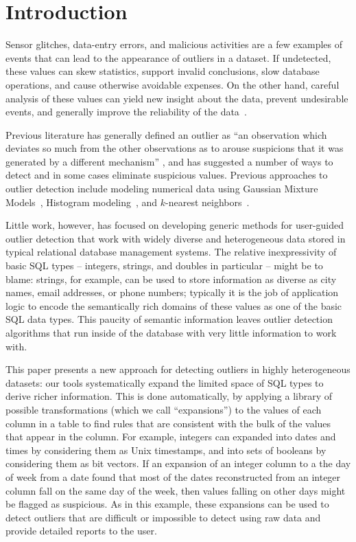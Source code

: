 \section{Introduction}
\label{sec:intro}

Sensor glitches, data-entry errors, and malicious activities are a few examples of events that can lead to the appearance of outliers in a dataset. If undetected, these values can skew statistics, support invalid conclusions, slow database operations, and cause otherwise avoidable expenses. On the other hand, careful analysis of these values can yield new insight about the data, prevent undesirable events, and generally improve the reliability of the data~\cite{Achour2014}.

Previous literature has generally defined an outlier as ``an observation which deviates so much from the other observations as to arouse suspicions that it was generated by a different mechanism'' \cite{Hawkins1980}, and has suggested a number of ways to detect and in some cases eliminate suspicious values. Previous approaches to outlier detection include modeling numerical data using Gaussian Mixture Models~\cite{Lu2005,Roberts1994,Roberts1999}, Histogram modeling~\cite{Gebski2007,Sheng2007}, and $k$-nearest neighbors~\cite{Ramaswamy2000}.

Little work, however, has focused on developing generic methods for user-guided outlier detection that work with widely diverse and heterogeneous data stored in typical relational database management systems. The relative inexpressivity of basic SQL types -- integers, strings, and doubles in particular -- might be to blame: strings, for example, can be used to store information as diverse as city names, email addresses, or phone numbers; typically it is the job of application logic to encode the semantically rich domains of these values as one of the basic SQL data types. This paucity of semantic information leaves outlier detection algorithms that run inside of the database with very little information to work with.  

This paper presents a new approach for detecting outliers in highly heterogeneous datasets: our tools systematically expand the limited space of SQL types to derive richer information.
This is done automatically, by applying a library of possible transformations (which we call ``expansions'') to the values of each column in a table to find rules that are consistent with the bulk of the values that appear in the column.
For example, integers can expanded into dates and times by considering them as Unix timestamps, and into sets of booleans by considering them as bit vectors. 
If an expansion of an integer column to a the day of week from a date found that most of the dates reconstructed from an integer column fall on the same day of the week, then values falling on other days might be flagged as suspicious. 
As in this example, these expansions  can be used to detect outliers that are difficult or impossible to detect using raw data and provide detailed reports to the user. 

